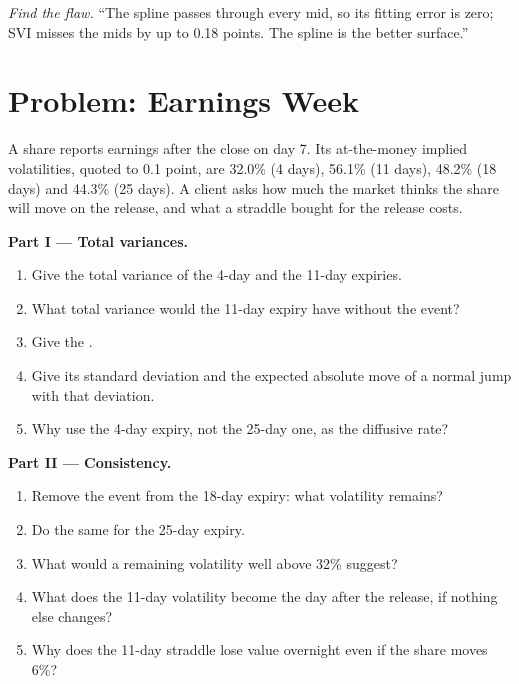 \begin{exercise}[$\star\star\star$]\label{exo:dv:parametrising-the-surface:8}
\emph{Find the flaw.} ``The spline passes through every mid, so its fitting error is zero; SVI misses
the mids by up to 0.18 points. The spline is the better surface.''
\end{exercise}

\section{Problem: Earnings Week}

\begin{problem}\label{pb:dv:parametrising-the-surface:1}
A share reports earnings after the close on day 7. Its at-the-money implied volatilities, quoted to
0.1 point, are 32.0\% (4 days), 56.1\% (11 days), 48.2\% (18 days) and 44.3\% (25 days). A client asks
how much the market thinks the share will move on the release, and what a straddle bought for the
release costs.

\medskip\noindent\textbf{Part I --- Total variances.}
\begin{enumerate}
\item Give the total variance of the 4-day and the 11-day expiries.
\item What total variance would the 11-day expiry have without the event?
\item Give the .
\item Give its standard deviation and the expected absolute move of a normal jump with that deviation.
\item Why use the 4-day expiry, not the 25-day one, as the diffusive rate?
\end{enumerate}

\medskip\noindent\textbf{Part II --- Consistency.}
\begin{enumerate}[resume]
\item Remove the event from the 18-day expiry: what volatility remains?
\item Do the same for the 25-day expiry.
\item What would a remaining volatility well above 32\% suggest?
\item What does the 11-day volatility become the day after the release, if nothing else changes?
\item Why does the 11-day straddle lose value overnight even if the share moves 6\%?
\end{enumerate}


\end{problem}

